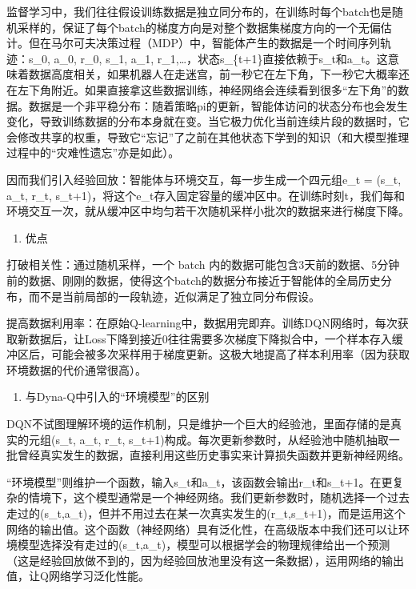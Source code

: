 监督学习中，我们往往假设训练数据是独立同分布的，在训练时每个batch也是随机采样的，保证了每个batch的梯度方向是对整个数据集梯度方向的一个无偏估计。但在马尔可夫决策过程（MDP）中，智能体产生的数据是一个时间序列轨迹：s\_0, a\_0, r\_0, s\_1, a\_1, r\_1,\ldots，状态s\_\{t+1\}直接依赖于s\_t和a\_t。这意味着数据高度相关，如果机器人在走迷宫，前一秒它在左下角，下一秒它大概率还在左下角附近。如果直接拿这些数据训练，神经网络会连续看到很多``左下角''的数据。数据是一个非平稳分布：随着策略pi的更新，智能体访问的状态分布也会发生变化，导致训练数据的分布本身就在变。当它极力优化当前连续片段的数据时，它会修改共享的权重，导致它``忘记''了之前在其他状态下学到的知识（和大模型推理过程中的``灾难性遗忘''亦是如此）。

因而我们引入经验回放：智能体与环境交互，每一步生成一个四元组e\_t = (s\_t, a\_t, r\_t, s\_t+1)，将这个e\_t存入固定容量的缓冲区中。在训练时刻t，我们每和环境交互一次，就从缓冲区中均匀若干次随机采样小批次的数据来进行梯度下降。

\begin{enumerate}
\def\labelenumi{\arabic{enumi}.}
\setcounter{enumi}{1}
\tightlist
\item
  优点
\end{enumerate}

打破相关性：通过随机采样，一个 batch 内的数据可能包含3天前的数据、5分钟前的数据、刚刚的数据，使得这个batch的数据分布接近于智能体的全局历史分布，而不是当前局部的一段轨迹，近似满足了独立同分布假设。

提高数据利用率：在原始Q-learning中，数据用完即弃。训练DQN网络时，每次获取新数据后，让Loss下降到接近0往往需要多次梯度下降拟合中，一个样本存入缓冲区后，可能会被多次采样用于梯度更新。这极大地提高了样本利用率（因为获取环境数据的代价通常很高）。

\begin{enumerate}
\def\labelenumi{\arabic{enumi}.}
\setcounter{enumi}{2}
\tightlist
\item
  与Dyna-Q中引入的``环境模型''的区别
\end{enumerate}

DQN不试图理解环境的运作机制，只是维护一个巨大的经验池，里面存储的是真实的元组(s\_t, a\_t, r\_t, s\_t+1)构成。每次更新参数时，从经验池中随机抽取一批曾经真实发生的数据，直接利用这些历史事实来计算损失函数并更新神经网络。

``环境模型''则维护一个函数，输入s\_t和a\_t，该函数会输出r\_t和s\_t+1。在更复杂的情境下，这个模型通常是一个神经网络。我们更新参数时，随机选择一个过去走过的(s\_t,a\_t)，但并不用过去在某一次真实发生的(r\_t,s\_t+1)，而是运用这个网络的输出值。这个函数（神经网络）具有泛化性，在高级版本中我们还可以让环境模型选择没有走过的(s\_t,a\_t)，模型可以根据学会的物理规律给出一个预测（这是经验回放做不到的，因为经验回放池里没有这一条数据），运用网络的输出值，让Q网络学习泛化性能。

